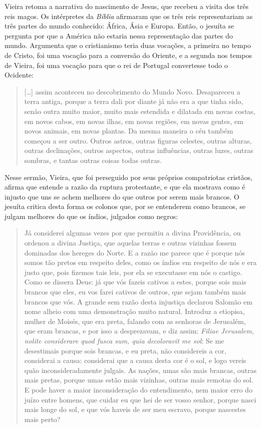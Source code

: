 Vieira retoma a narrativa do nascimento de Jesus, que recebeu a visita
dos três reis magos. Os intérpretes da \emph{Bíblia} afirmaram que os
três reis representariam as três partes do mundo conhecido: África, Ásia
e Europa. Então, o jesuíta se pergunta por que a América não estaria
nessa representação das partes do mundo. Argumenta que o cristianismo
teria duas vocações, a primeira no tempo de Cristo, foi uma vocação para
a conversão do Oriente, e a segunda nos tempos de Vieira, foi uma
vocação para que o rei de Portugal convertesse todo o Ocidente:

\begin{quote}
{[}\ldots{}{]} assim aconteceu no descobrimento do Mundo Novo. Desapareceu
a terra antiga, porque a terra dali por diante já não era a que tinha
sido, senão outra muito maior, muito mais estendida e dilatada em novas
costas, em novos cabos, em novas ilhas, em novas regiões, em novas
gentes, em novos animais, em novas plantas. Da mesma maneira o céu
também começou a ser outro. Outros astros, outras figuras celestes,
outras alturas, outras declinações, outros aspectos, outras influências,
outras luzes, outras sombras, e tantas outras coisas todas outras.
\end{quote}

Nesse sermão, Vieira, que foi perseguido por seus próprios compatriotas
cristãos, afirma que entende a razão da ruptura protestante, e que ela
mostrava como é injusto que uns se achem melhores do que outros por
serem mais brancos. O jesuíta critica desta forma os colonos que, por se
entenderem como brancos, se julgam melhores do que os índios, julgados
como negros:

\begin{quote}
Já considerei algumas vezes por que permitiu a divina Providência, ou
ordenou a divina Justiça, que aquelas terras e outras vizinhas fossem
dominadas dos hereges do Norte. E a razão me parece que é porque nós
somos tão pretos em respeito deles, como os índios em respeito de nós e
era justo que, pois fizemos tais leis, por ela se executasse em nós o
castigo. Como se dissera Deus: já que vós fazeis cativos a estes, porque
sois mais brancos que eles, eu vos farei cativos de outros, que sejam
também mais brancos que vós. A grande sem razão desta injustiça declarou
Salomão em nome alheio com uma demonstração muito natural. Introduz a
etiopisa, mulher de Moisés, que era preta, falando com as senhoras de
Jerusalém, que eram brancas, e por isso a desprezavam, e diz assim:
\emph{Filiae Jerusalem, nolite considerare quod fusca sum, quia
decoloravit me sol}: Se me desestimais porque sois brancas, e eu preta,
não considereis a cor, considerai a causa: considerai que a causa desta
cor é o sol, e logo vereis quão inconsideradamente julgais. As nações,
umas são mais brancas, outras mais pretas, porque umas estão mais
vizinhas, outras mais remotas do sol. E pode haver a maior
inconsideração do entendimento, nem maior erro do juízo entre homens,
que cuidar eu que hei de ser vosso senhor, porque nasci mais longe do
sol, e que vós haveis de ser meu escravo, porque nascestes mais perto?
\end{quote}

